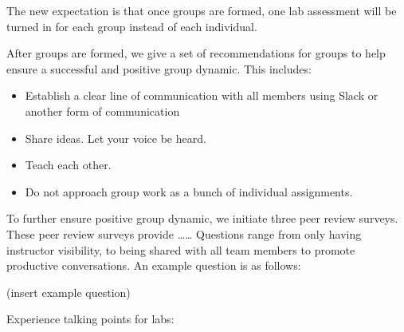 \documentclass[
  12pt]{article}
\newenvironment{Shaded}{\begin{snugshade}}{\end{snugshade}}
\newcommand{\AttributeTok}[1]{\textcolor[rgb]{0.40,0.45,0.13}{#1}}
\newcommand{\CommentTok}[1]{\textcolor[rgb]{0.37,0.37,0.37}{#1}}
\newcommand{\FunctionTok}[1]{\textcolor[rgb]{0.28,0.35,0.67}{#1}}
\newcommand{\NormalTok}[1]{\textcolor[rgb]{0.00,0.23,0.31}{#1}}
\newcommand{\OtherTok}[1]{\textcolor[rgb]{0.00,0.23,0.31}{#1}}
\newcommand{\SpecialCharTok}[1]{\textcolor[rgb]{0.37,0.37,0.37}{#1}}
\newcommand{\StringTok}[1]{\textcolor[rgb]{0.13,0.47,0.30}{#1}}
\begin{document}
\begin{Shaded}
\end{Shaded}

The new expectation is that once groups are formed, one lab assessment
will be turned in for each group instead of each individual.

After groups are formed, we give a set of recommendations for groups to
help ensure a successful and positive group dynamic. This includes:

\begin{itemize}
\item
  Establish a clear line of communication with all members using Slack
  or another form of communication
\item
  Share ideas. Let your voice be heard.
\item
  Teach each other.
\item
  Do not approach group work as a bunch of individual assignments.
\end{itemize}

To further ensure positive group dynamic, we initiate three peer review
surveys. These peer review surveys provide \ldots\ldots{} Questions
range from only having instructor visibility, to being shared with all
team members to promote productive conversations. An example question is
as follows:

(insert example question)

Experience talking points for labs:
\end{document}
